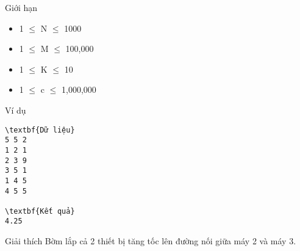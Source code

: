 Giới hạn
\begin{itemize}
	\item     1  $\le$  N  $\le$  1000   
	\item     1  $\le$  M  $\le$  100,000   
	\item     1  $\le$  K  $\le$  10   
	\item     1  $\le$  c  $\le$  1,000,000   
\end{itemize}
Ví dụ
\begin{verbatim}
\textbf{Dữ liệu}
5 5 2
1 2 1
2 3 9
3 5 1
1 4 5
4 5 5

\textbf{Kết quả}
4.25
\end{verbatim}
Giải thích
Bờm lắp cả 2 thiết bị tăng tốc lên đường nối giữa máy 2 và máy 3.